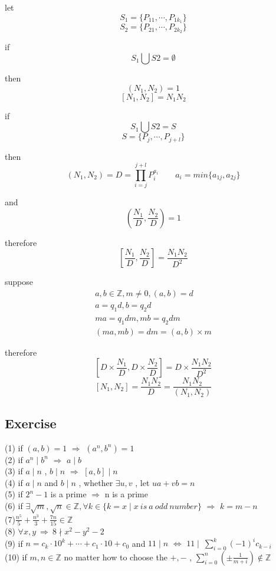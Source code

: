 \documentclass{ctexart}
\begin{document}
let
\[S_1=\{P_{11},\cdots,P_{1k_1}\}\]
\[S_2=\{P_{21},\cdots,P_{2k_2}\}\]

if 
\[S_1 \bigcup S2=\emptyset\]

then
\[(N_1,N_2)=1\]
\[[N_1,N_2]=N_1N_2\]

if 
\[S_1 \bigcup S2=S\]
\[S=\{P_j,\cdots,P_{j+l}\}\]

then
\[(N_1,N_2)=D=\prod_{i=j}^{j+l}{P_{i}^{a_i}}\qquad a_i=min\{a_{1j},a_{2j}\}\]

and 
\[(\frac{N_1}{D},\frac{N_2}{D})=1\]

therefore
\[[\frac{N_1}{D},\frac{N_2}{D}]=\frac{N_1N_2}{D^2}\]

suppose
\begin{align*}
a , b\in \mathbb{Z}, m\neq 0, (a,b)=d\\
a=q_1d,b=q_2d\\
ma=q_1dm,mb=q_2dm\\
(ma,mb)=dm=(a,b)\times m
\end{align*}

therefore
\[[D\times \frac{N_1}{D},D\times \frac{N_2}{D}]= D\times \frac{N_1N_2}{D^2}  \]
\[[N_1,N_2]=\frac{N_1N_2}{D}=\frac{N_1N_2}{(N_1,N_2)} \]

\vspace{12 pt}
\subsection{Exercise}
\noindent(1) if \((a,b)=1\) \(\Rightarrow\) \((a^n,b^n)=1\)\\
(2) if \(a^n\mid b^n\) \(\Rightarrow\) \(a\mid b\)\\
(3) if \(a\mid n\) , \(b\mid n\) \(\Rightarrow\) \([a,b]\mid n\)\\
(4) if \(a\mid n\) and \(b\mid n\) , whether \(\exists u,v\) , let \(ua+vb=n\)\\
(5) if \(2^n-1\) is a prime \(\Rightarrow\) n is a prime\\
(6) if \(\exists \sqrt{m},\sqrt{n}\in\mathbb{Z},\forall k\in \{k=x \mid x\ is\ a\ odd\ number\}\) \(\Rightarrow\) \(k=m-n\)\\
(7)\(\frac{n^5}{5}+\frac{n^3}{3}+\frac{7n}{15}\in\mathbb{Z}\) \\
(8) \(\forall x,y\ \Rightarrow\ 8\nmid x^2-y^2-2\)\\
(9) if \(n=c_k\cdot 10^k+\cdots +c_1\cdot 10+c_0\) and \(11\mid n\) \(\Leftrightarrow\) \(11\mid\ \sum_{i=0}^{k}{(-1)^{i}c_{k-i}}\)\\
(10) if \(m,n\in\mathbb{Z}\) no matter how to choose the \(+,-\) , \(\sum_{i=0}^{n}({\pm \frac{1}{m+i}})\notin \mathbb{Z}\) 
\end{document}
